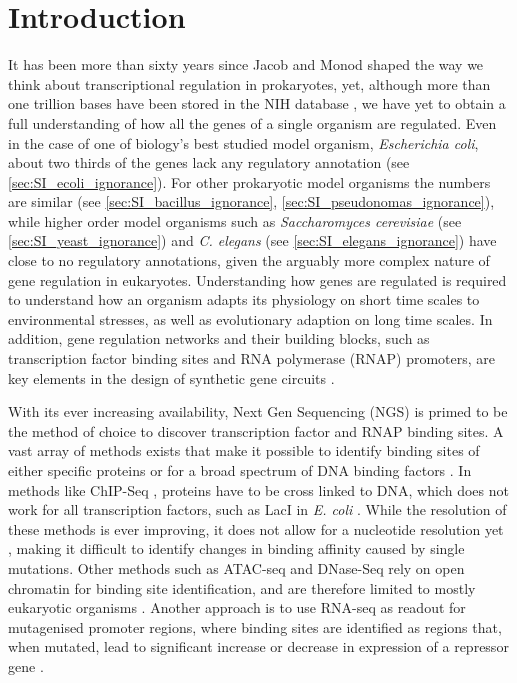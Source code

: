 \section{Introduction}
It has been more than sixty years since Jacob and Monod \cite{jacob1961genetic} shaped the way we think about transcriptional regulation in prokaryotes, yet, although more than one trillion bases have been stored in the NIH database \cite{genbank}, we have yet to obtain a full understanding of how all the genes of a single organism are regulated. Even in the case of one of biology's best studied model organism, \textit{Escherichia coli}, about two thirds of the genes lack any regulatory annotation (see \ref{sec:SI_ecoli_ignorance}). For other prokaryotic model organisms the numbers are similar (see \ref{sec:SI_bacillus_ignorance}, \ref{sec:SI_pseudonomas_ignorance}), while higher order model organisms such as \textit{Saccharomyces cerevisiae} (see \ref{sec:SI_yeast_ignorance}) and \textit{C. elegans} (see \ref{sec:SI_elegans_ignorance}) have close to no regulatory annotations, given the arguably more complex nature of gene regulation in eukaryotes. Understanding how genes are regulated is required to understand how an organism adapts its physiology on short time scales to environmental stresses, as well as evolutionary adaption on long time scales. In addition, gene regulation networks and their building blocks, such as transcription factor binding sites and RNA polymerase (RNAP) promoters, are key elements in the design of synthetic gene circuits \cite{elowitz2000synthetic} .

With its ever increasing availability, Next Gen Sequencing (NGS) is primed to be the method of choice to discover transcription factor and RNAP binding sites. A vast array of methods exists that make it possible to identify binding sites of either specific proteins  or for a broad spectrum of DNA binding factors . In methods like ChIP-Seq \cite{rhee2012chip}, proteins have to be cross linked to DNA, which does not work for all transcription factors, such as LacI in \textit{E. coli} . While the resolution of these methods is ever improving, it does not allow for a nucleotide resolution yet , making it difficult to identify changes in binding affinity caused by single mutations. Other methods such as ATAC-seq \cite{buenrostro2015atac, li2019identification} and DNase-Seq \cite{boyle2008high} rely on open chromatin for binding site identification, and are therefore limited to mostly eukaryotic organisms . Another approach is to use RNA-seq as readout for mutagenised promoter regions, where binding sites are identified as regions that, when mutated, lead to significant increase or decrease in expression of a repressor gene \cite{urtecho2018systematic, urtecho2020genome, ireland2020deciphering}. 

